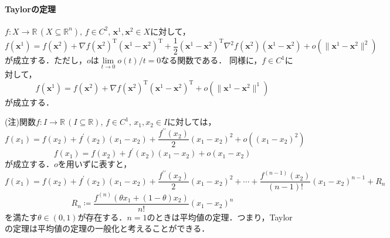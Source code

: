\documentclass{jsreport}
\begin{document}
\paragraph{Taylorの定理}
$f: X \rightarrow \mathbb{R} \, (X \subseteq \mathbb{R}^n), \, f \in C^2, \, \bm{x}^1, \bm{x}^2 \in X$に対して，
\begin{equation}
  f(\bm{x}^1) = f(\bm{x}^2) + \nabla f(\bm{x}^2)^{\mathrm{T}} (\bm{x}^1 - \bm{x}^2)^{\mathrm{T}} + \frac{1}{2} (\bm{x}^1 - \bm{x}^2)^{\mathrm{T}} \nabla^2 f(\bm{x}^2) (\bm{x}^1 - \bm{x}^2) + o(\|\bm{x}^1 - \bm{x}^2 \|^2) \nonumber
\end{equation}
が成立する．ただし，$o$は$\lim\limits_{t \rightarrow 0} o(t) / t = 0$なる関数である．
同様に，$f \in C^1$に対して，
\begin{equation}
    f(\bm{x}^1) = f(\bm{x}^2) + \nabla f(\bm{x}^2)^{\mathrm{T}} (\bm{x}^1 - \bm{x}^2)^{\mathrm{T}} + o(\|\bm{x}^1 - \bm{x}^2 \|^1) \nonumber
\end{equation}
が成立する．

(注)関数$f: I \rightarrow \mathbb{R} \, (I \subseteq \mathbb{R}), \, f \in C^1, \, x_1, x_2 \in I$に対しては，
\begin{equation}
  f(x_1) = f(x_2) + f^{\prime}(x_2)(x_1 - x_2) + \frac{f^{\prime \prime}(x_2)}{2}(x_1 - x_2)^2 + o((x_1 - x_2)^2) \nonumber
\end{equation}
\begin{equation}
  f(x_1) = f(x_2) + f^{\prime}(x_2)(x_1 - x_2) + o(x_1 - x_2) \nonumber
\end{equation}
が成立する．$o$を用いずに表すと，
\begin{equation}
  f(x_1) = f(x_2) + f^{\prime}(x_2)(x_1 - x_2) + \frac{f^{\prime \prime}(x_2)}{2}(x_1 - x_2)^2 + \cdots + \frac{f^{(n - 1)}(x_2)}{(n - 1)!}(x_1 - x_2)^{n - 1} + R_n \nonumber
\end{equation}
\begin{equation}
  R_n \coloneqq \frac{f^{(n)}(\theta x_1 + (1 - \theta)x_2)}{n!}(x_1 - x_2)^n \nonumber
\end{equation}
を満たす$\theta \in (0, 1)$が存在する．$n = 1$のときは平均値の定理．つまり，Taylorの定理は平均値の定理の一般化と考えることができる．
\end{document}
